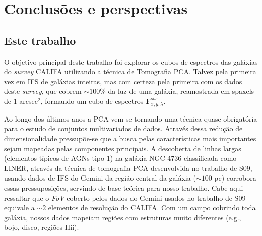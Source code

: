 


\chapter{Conclusões e perspectivas}
\label{sec:conclusao}


\section{Este trabalho}
\label{sec:conclusao:thisWork}

O objetivo principal deste trabalho foi explorar os cubos de espectros das galáxias do {\em survey} CALIFA utilizando a
técnica de Tomografia PCA. Talvez pela primeira vez em IFS de galáxias inteiras, mas com certeza pela primeira com os
dados deste {\em survey}, que cobrem $\sim100\%$ da luz de uma galáxia, reamostrada em spaxels de 1 arcsec$^2$, formando
um cubo de espectros $\mathbf{F}_{x,y,\lambda}^{obs}$. 

Ao longo dos últimos anos a PCA vem se tornando uma técnica quase obrigatória para o estudo de conjuntos multivariados
de dados. Através dessa redução de dimensionalidade pressupõe-se que a busca pelas características mais importantes sejam
mapeadas pelas componentes principais. A descoberta de linhas largas (elementos típicos de AGNs tipo 1) na galáxia NGC
4736 classificada como LINER, através da técnica de tomografia PCA desenvolvida no trabalho de S09, usando dados de IFS
do Gemini da região central da galáxia ($\sim100$ pc) corrobora essas pressuposições, servindo de base teórica para
nosso trabalho. Cabe aqui ressaltar que o {\em FoV} coberto pelos dados do Gemini usados no trabalho de S09 equivale a
$\sim2$ elementos de resolução do CALIFA. Com um campo cobrindo toda galáxia, nossos dados mapeiam regiões com
estruturas muito diferentes (e.g., bojo, disco, regiões H{\sc ii}).

